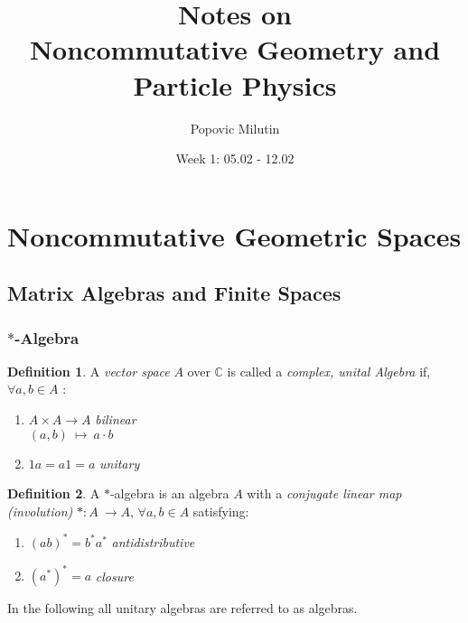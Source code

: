 \documentclass[a4paper]{article}
\title{Notes on \\ Noncommutative Geometry and Particle Physics}
\author{Popovic Milutin}
\date{Week 1: 05.02 - 12.02}
\theoremstyle{definition}
\newtheorem{definition}{Definition}
\theoremstyle{definition}
\theoremstyle{theorem}
\theoremstyle{theorem}
\theoremstyle{definition}
\begin{document}
\maketitle
\tableofcontents

\section{Noncommutative Geometric Spaces}
\subsection{Matrix Algebras and Finite Spaces}
\subsubsection{$*$-Algebra}
\begin{definition}
    A \textit{vector space} $A$ over $\mathbb{C}$ is called a \textit{complex, unital Algebra} if, \\
    $\forall a,b \in A$ :
    \begin{enumerate}
        \item
            $A \times A \rightarrow A$       \hspace{0.1\textwidth} \textit{bilinear} \\
            $(a, b)\ \mapsto \ a\cdot b$
        \item
            $1a = a1 =a$                     \hspace{0.08\textwidth}  \textit{unitary} \\
    \end{enumerate}
\end{definition}

\begin{definition}
    A $*$-algebra is an algebra $A$ with a \textit{conjugate linear map (involution)} $*:A\ \rightarrow  A$,
    $\forall a, b \in A$ satisfying:
    \begin{enumerate}
        \item
            $(ab)^* = b^*a^*$         \hspace{0.05\textwidth} \textit{antidistributive}
        \item
            $(a^*)^* = a$                   \hspace{0.1\textwidth} \textit{closure}
    \end{enumerate}
\end{definition}
In the following all unitary algebras are referred to as algebras.
\end{document}
